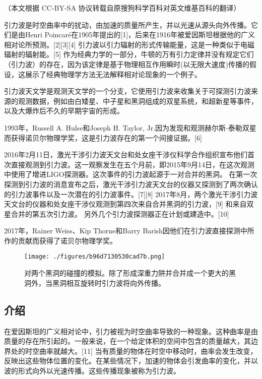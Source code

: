 
（本文根据 CC-BY-SA 协议转载自原搜狗科学百科对英文维基百科的翻译）


引力波是时空曲率中的扰动，由加速的质量所产生，并以光速从源头向外传播。它们是由Henri Poincaré在1905年提出的[1]，后来在1916年被爱因斯坦根据他的广义相对论所预测。[2][3][4] 引力波以引力辐射的形式传输能量，这是一种类似于电磁辐射的辐射能。[5] 作为经典力学的一部分，牛顿的万有引力定律并没有规定它们（引力波）的存在，因为该定律是基于物理相互作用瞬时(以无限大速度)传播的假设，这展示了经典物理学方法无法解释相对论现象的一个例子。

引力波天文学是观测天文学的一个分支，它使用引力波来收集关于可探测引力波来源的观测数据，例如由白矮星、中子星和黑洞组成的双星系统，和超新星等事件，以及大爆炸后不久的早期宇宙的形成。

1993年，Russell A. Hulse和Joseph H. Taylor, Jr.因为发现和观测赫尔斯-泰勒双星而获得诺贝尔物理学奖，这是引力波存在的第一个间接证据。[6]

2016年2月11日，激光干涉引力波天文台和处女座干涉仪科学合作组织宣布他们首次直接观测到引力波。这一观察发生在五个月前，即2015年9月14日，在这次观测中使用了增进LIGO探测器。这次事件的引力波起源于一对合并的黑洞。 在第一次探测到引力波的消息宣布之后，激光干涉引力波天文台的仪器又探测到了两次确认的引力波事件以及一次潜在的引力波事件。[7][8] 2017年8月，两个激光干涉引力波天文台的仪器和处女座干涉仪观测到第四次来自合并黑洞的引力波，[9] 和来自双星合并的第五次引力波。 另外几个引力波探测器正在计划或建造中。[10]

2017年，Rainer Weiss、Kip Thorne和Barry Barish因他们在引力波直接探测中所作的贡献而获得了诺贝尔物理学奖。

\begin{figure}[ht]
\centering
\texttt{[image: ./figures/b96d7130530cad7b.png]}
\caption{对两个黑洞的碰撞的模拟。除了形成深重力阱并合并成一个更大的黑洞外，当黑洞相互旋转时引力波将向外传播。} \label{fig_YLB_1}
\end{figure}

\subsection{介绍}

在爱因斯坦的广义相对论中，引力被视为时空曲率导致的一种现象。这种曲率是由质量的存在所引起的。一般来说，在一个给定体积的空间中包含的质量越大，其边界处的时空曲率就越大。[11] 当有质量的物体在时空中移动时，曲率会发生改变，反映出这些物体位置的变化。在某些情况下，加速的物体会引发曲率的变化，并以波的形式向外以光速传播。这些传播现象被称为引力波。

